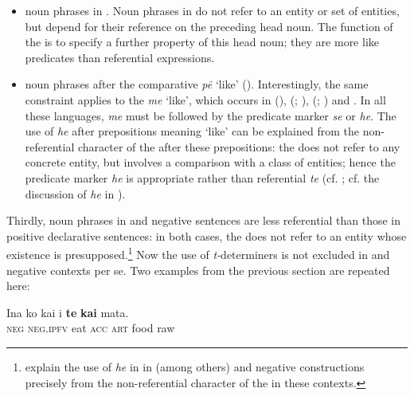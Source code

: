 \begin{itemize}
\item 
noun phrases in . Noun phrases in  do not refer to an entity or set of entities, but depend for their reference on the preceding head noun. The function of the  is to specify a further property of this head noun; they are more like predicates than referential expressions.

\item 
noun phrases after the comparative  \textit{pē} ‘like’ (). Interestingly, the same constraint applies to the  \textit{me} ‘like’, which occurs in  (\citealt[136–137]{Cablitz2006}),  (\citealt[53]{Cook1999}; \citealt[156]{ElbertPukui1979}),  (\citealt[237]{Polinsky1992}; \citealt[356]{Bauer1993}) and  \citep[224]{Besnier2000}. In all these languages, \textit{me} must be followed by the predicate marker \textit{se} or \textit{he}. The use of \textit{he} after prepositions meaning ‘like’ can be explained from the non-referential character of the  after these prepositions: the  does not refer to any concrete entity, but involves a comparison with a class of entities; hence the predicate marker \textit{he} is appropriate rather than referential \textit{te} (cf. \citealt[236]{Polinsky1992}; cf. the discussion of \textit{he} in ). 

\end{itemize}

Thirdly, noun phrases in  and negative sentences are less referential than those in positive declarative sentences: in both cases, the  does not refer to an entity whose existence is presupposed.\footnote{\label{fn:254}\citet[437]{ChungMason1995} explain the use of \textit{he} in  in (among others)  and negative constructions precisely from the non-referential character of the  in these contexts.} Now the use of \textit{t-}determiners is not excluded in  and negative contexts per se. Two examples from the previous section are repeated here:

\ea\label{ex:5.39}
\gll {\ꞌ}Ina ko kai i \textbf{te} \textbf{kai} mata. \\
\textsc{neg} \textsc{neg.ipfv} eat \textsc{acc} \textsc{art} food raw \\

